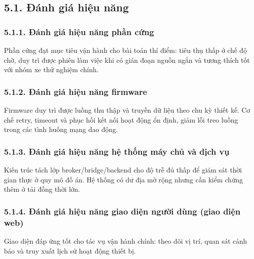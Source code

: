\documentclass[a4paper]{extarticle}
\begin{document}
\subsection{5.1. Đánh giá hiệu năng}

\subsubsection{5.1.1. Đánh giá hiệu năng phần cứng}

Phần cứng đạt mục tiêu vận hành cho bài toán thí điểm: tiêu thụ thấp ở chế độ chờ, duy trì được phiên làm việc khi có gián đoạn nguồn ngắn và tương thích tốt với nhóm xe thử nghiệm chính.

\subsubsection{5.1.2. Đánh giá hiệu năng firmware}

Firmware duy trì được luồng thu thập và truyền dữ liệu theo chu kỳ thiết kế. Cơ chế retry, timeout và phục hồi kết nối hoạt động ổn định, giảm lỗi treo luồng trong các tình huống mạng dao động.

\subsubsection{5.1.3. Đánh giá hiệu năng hệ thống máy chủ và dịch vụ}

Kiến trúc tách lớp broker/bridge/backend cho độ trễ đủ thấp để giám sát thời gian thực ở quy mô đồ án. Hệ thống có dư địa mở rộng nhưng cần kiểm chứng thêm ở tải đồng thời lớn.

\subsubsection{5.1.4. Đánh giá hiệu năng giao diện người dùng (giao diện web)}

Giao diện đáp ứng tốt cho tác vụ vận hành chính: theo dõi vị trí, quan sát cảnh báo và truy xuất lịch sử hoạt động thiết bị.
\end{document}
